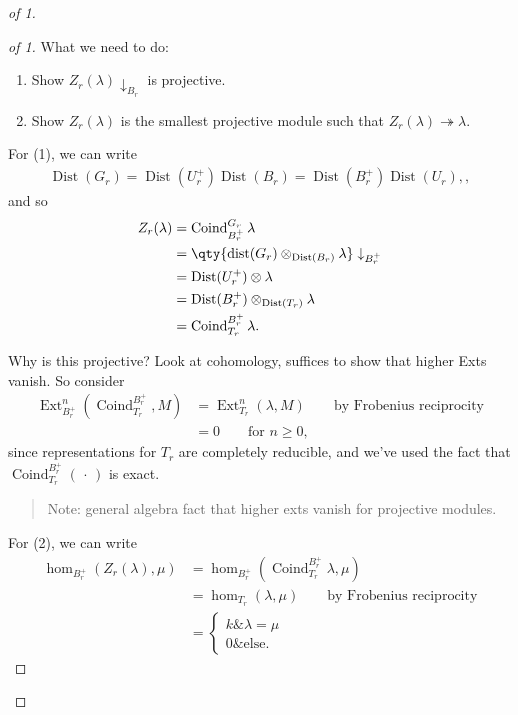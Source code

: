 \begin{proof}[of 1]

\begin{proof}[of 1]

What we need to do:

\begin{enumerate}
\def\labelenumi{\arabic{enumi}.}
\tightlist
\item
  Show \(Z_r(\lambda)\downarrow_{B_r}\) is projective.
\item
  Show \(Z_r(\lambda)\) is the smallest projective module such that
  \(Z_r(\lambda) \twoheadrightarrow\lambda\).
\end{enumerate}

For (1), we can write
\begin{align*} \operatorname{Dist}(G_r) = \operatorname{Dist}(U_r^+) \operatorname{Dist}(B_r) = \operatorname{Dist}(B_r^+) \operatorname{Dist}(U_r), ,\end{align*}
and so
\begin{align*}   Z_r(\lambda)  &= \operatorname{Coind}_{B_r^+}^{G_r} \lambda \\ &= \qty{\operatorname{dist}(G_r) \otimes_{\operatorname{Dist}(B_r)} \lambda} \downarrow_{B_r^+} \\ &= \operatorname{Dist}(U_r^+)\otimes\lambda \\ &= \operatorname{Dist}(B_r^+) \otimes_{\operatorname{Dist}(T_r)} \lambda \\ &= \operatorname{Coind}_{T_r}^{B_r^+} \lambda .\end{align*}

Why is this projective? Look at cohomology, suffices to show that higher
Exts vanish. So consider
\begin{align*}   \operatorname{Ext}_{B_r^+}^n(\operatorname{Coind}_{T_r}^{B_r^+}, M)  &= \operatorname{Ext}_{T_r}^n (\lambda, M) \qquad\text{by Frobenius reciprocity} \\ &= 0 \qquad \text{for } n \geq 0 ,\end{align*}
since representations for \(T_r\) are completely reducible, and we've
used the fact that \(\operatorname{Coind}_{T_r}^{B_r^+}({\,\cdot\,})\)
is exact.

\begin{quote}
Note: general algebra fact that higher exts vanish for projective
modules.
\end{quote}

For (2), we can write
\begin{align*}   \hom_{B_r^+}(Z_r(\lambda), \mu) &= \hom_{B_r^+}(\operatorname{Coind}_{T_r}^{B_r^+} \lambda, \mu) \\ &= \hom_{T_r} (\lambda, \mu) \qquad\text{by Frobenius reciprocity} \\ &= \begin{cases} k \& \lambda = \mu \\ 0 \& \text{else}. \end{cases} \end{align*}


\end{proof}
\end{proof}
